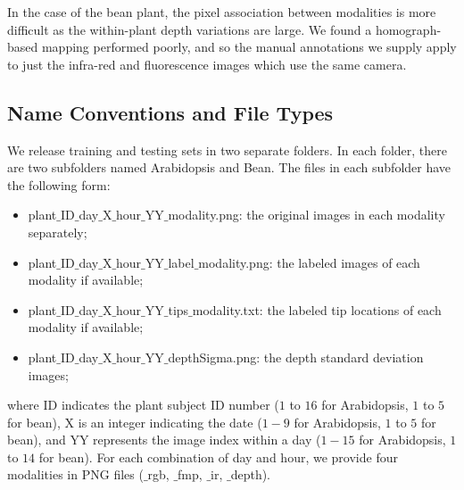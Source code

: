 In the case of the bean plant, the pixel association between modalities is more difficult as the within-plant depth variations are large.  
We found a homograph-based mapping performed poorly, and so the manual annotations we supply apply to just the infra-red and fluorescence images which use the same camera.

\subsection{Name Conventions and File Types}
We release training and testing sets in two separate folders.
In each folder, there are two subfolders named Arabidopsis and Bean.
The files in each subfolder have the following form:

\begin{itemize}
\item plant$\_$ID$\_$day$\_$X$\_$hour$\_$YY$\_$modality.png: the original images in each modality separately;
\item plant$\_$ID$\_$day$\_$X$\_$hour$\_$YY$\_$label$\_$modality.png: the labeled images of each modality if available;
\item plant$\_$ID$\_$day$\_$X$\_$hour$\_$YY$\_$tips$\_$modality.txt: the labeled tip locations of each modality if available;
\item plant$\_$ID$\_$day$\_$X$\_$hour$\_$YY$\_$depthSigma.png: the depth standard deviation images;
\end{itemize}
where ID indicates the plant subject ID number ($1$ to $16$ for Arabidopsis, $1$ to $5$ for bean), X is an integer indicating the date ($1-9$ for Arabidopsis, $1$ to $5$ for bean), and YY represents the image index within a day ($1-15$ for Arabidopsis, $1$ to $14$ for bean).
For each combination of day and hour, we provide four modalities in PNG files ($\_$rgb, $\_$fmp, $\_$ir, $\_$depth).
